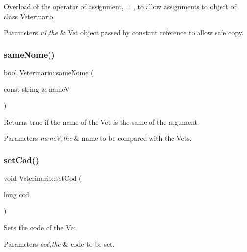 Overload of the operator of assignment, = , to allow assignments to object of class \mbox{\hyperlink{class_veterinario}{Veterinario}}. 
\begin{DoxyParams}{Parameters}
{\em v1,the} & Vet object passed by constant reference to allow safe copy. \\
\hline
\end{DoxyParams}
\mbox{\label{class_veterinario_a90920e323e0b3c1a7872af0ebdb66cb3}} 
\subsubsection{\texorpdfstring{same\+Nome()}{sameNome()}}
{\footnotesize\ttfamily bool Veterinario\+::same\+Nome (\begin{DoxyParamCaption}\item[{const string \&}]{nameV }\end{DoxyParamCaption})}

Returns true if the name of the Vet is the same of the argument. 
\begin{DoxyParams}{Parameters}
{\em nameV,the} & name to be compared with the Vet\textquotesingle{}s. \\
\hline
\end{DoxyParams}
\mbox{\label{class_veterinario_a8566b2b3e95477bd963977c885eb8f58}} 
\subsubsection{\texorpdfstring{set\+Cod()}{setCod()}}
{\footnotesize\ttfamily void Veterinario\+::set\+Cod (\begin{DoxyParamCaption}\item[{long}]{cod }\end{DoxyParamCaption})}

Sets the code of the Vet 
\begin{DoxyParams}{Parameters}
{\em cod,the} & code to be set. \\
\hline
\end{DoxyParams}
\mbox{\label{class_veterinario_a17ee089a0350218bda6d8f258c17b11c}} 
